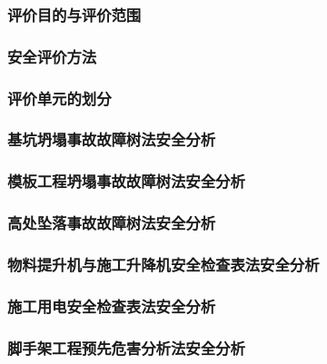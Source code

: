 \subsubsection{评价目的与评价范围}
\subsubsection{安全评价方法}
\subsubsection{评价单元的划分}
\subsubsection{基坑坍塌事故故障树法安全分析}
\subsubsection{模板工程坍塌事故故障树法安全分析}
\subsubsection{高处坠落事故故障树法安全分析}
\subsubsection{物料提升机与施工升降机安全检查表法安全分析}
\subsubsection{施工用电安全检查表法安全分析}
\subsubsection{脚手架工程预先危害分析法安全分析}